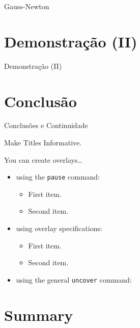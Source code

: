 \documentclass{beamer}
\begin{document}
\begin{frame}{Gauss-Newton}
\end{frame}

\section{Demonstração (II)}
\begin{frame}{Demonstração (II)}
\end{frame}

\section{Conclusão}

\begin{frame}{Conclusões e Continuidade}
\end{frame}

\begin{frame}{Make Titles Informative.}

  You can create overlays\dots
  \begin{itemize}
  \item using the \texttt{pause} command:
    \begin{itemize}
    \item
      First item.
      \pause
    \item    
      Second item.
    \end{itemize}
  \item
    using overlay specifications:
    \begin{itemize}
    \item<3->
      First item.
    \item<4->
      Second item.
    \end{itemize}
  \item
    using the general \texttt{uncover} command:
    \begin{itemize}
    \end{itemize}
  \end{itemize}
\end{frame}



\section*{Summary}
\end{document}
